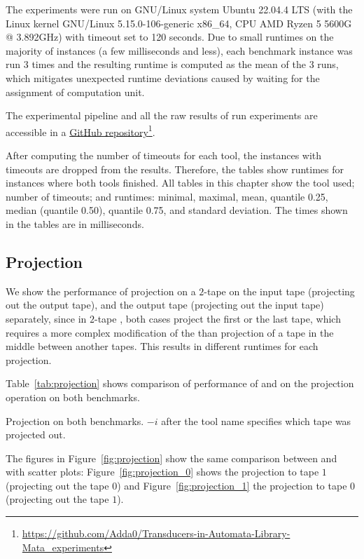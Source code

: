 The experiments were run on GNU/Linux system Ubuntu 22.04.4 LTS (with the Linux kernel GNU/Linux 5.15.0-106-generic x86\_64, CPU AMD Ryzen 5 5600G @ 3.892GHz) with timeout set to 120 seconds. Due to small runtimes on the majority of instances (a few milliseconds and less), each benchmark instance was run $3$ times and the resulting runtime is computed as the mean of the $3$ runs, which mitigates unexpected runtime deviations caused by waiting for the assignment of computation unit.

The experimental pipeline and all the raw results of run experiments are accessible in a \href{https://github.com/Adda0/Transducers-in-Automata-Library-Mata_experiments}{GitHub repository}\footnote{\url{
https://github.com/Adda0/Transducers-in-Automata-Library-Mata_experiments}}.

After computing the number of timeouts for each tool, the instances with timeouts are dropped from the results.
Therefore, the tables show runtimes for instances where both tools finished.
All tables in this chapter show the tool used; number of timeouts; and runtimes: minimal, maximal, mean, quantile 0.25, median (quantile 0.50), quantile 0.75, and standard deviation.
The times shown in the tables are in milliseconds.

\subsection{Projection}

We show the performance of projection on a $2$-tape \nfts on the input tape (projecting out the output tape), and the output tape (projecting out the input tape) separately, since in $2$-tape \nfts, both cases project the first or the last tape, which requires a more complex modification of the \nft than projection of a tape in the middle between another tapes.
This results in different runtimes for each projection.

Table~\ref{tab:projection} shows comparison of performance of \mata and \mona on the projection operation on both benchmarks.

\begin{table}[ht]
  \centering
  
  \caption{
    Projection on both benchmarks. $-i$ after the tool name specifies which tape was projected out.
  }
  \label{tab:projection}
\end{table}

The figures in Figure~\ref{fig:projection} show the same comparison between \mata and \mona with scatter plots: Figure~\ref{fig:projection_0} shows the projection to tape $1$ (projecting out the tape $0$) and Figure~\ref{fig:projection_1} the projection to tape $0$ (projecting out the tape $1$).

